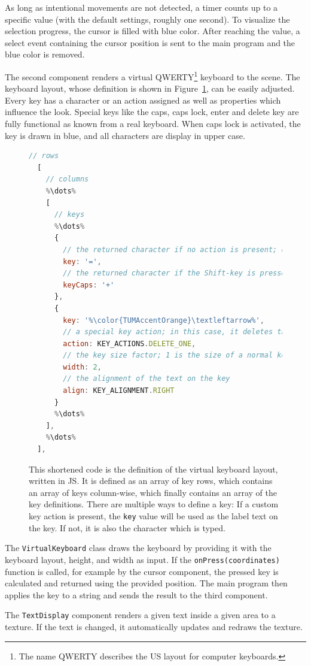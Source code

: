 As long as intentional movements are not detected, a timer counts up to a specific value (with the default settings, roughly one second). To visualize the selection progress, the cursor is filled with blue color. After reaching the value, a select event containing the cursor position is sent to the main program and the blue color is removed. 

The second component renders a virtual QWERTY\footnote{The name QWERTY describes the US layout for computer keyboards.} keyboard to the scene. The keyboard layout, whose definition is shown in Figure~\ref{fig:virtual-keyboard-layout}, can be easily adjusted. Every key has a character or an action assigned as well as properties which influence the look. Special keys like the caps, caps lock, enter and delete key are fully functional as known from a real keyboard. When caps lock is activated, the key is drawn in blue, and all characters are display in upper case.

\begin{figure}[H]
	\begin{lstlisting}[language=JavaScript]
  // rows
  [
    // columns
    %\dots%
    [ 
      // keys
      %\dots%
      {
        // the returned character if no action is present; otherwise just a label
        key: '=',
        // the returned character if the Shift-key is pressed
        keyCaps: '+'
      },
      {
        key: '%\color{TUMAccentOrange}\textleftarrow%',
        // a special key action; in this case, it deletes the last character
        action: KEY_ACTIONS.DELETE_ONE,
        // the key size factor; 1 is the size of a normal key
        width: 2, 
        // the alignment of the text on the key
        align: KEY_ALIGNMENT.RIGHT
      }
      %\dots%
    ],
    %\dots%
  ],
  \end{lstlisting}
	\caption[Virtual keyboard layout definition]{This shortened code is the definition of the virtual keyboard layout, written in \gls{JS}. It is defined as an array of key rows, which contains an array of keys column-wise, which finally contains an array of the key definitions. There are multiple ways to define a key: If a custom key action is present, the \lstinline{key} value will be used as the label text on the key. If not, it is also the character which is typed. }\label{fig:virtual-keyboard-layout}
\end{figure}

The \lstinline{VirtualKeyboard} class draws the keyboard by providing it with the keyboard layout, height, and width as input. If the \lstinline{onPress(coordinates)} function is called, for example by the cursor component, the pressed key is calculated and returned using the provided position. The main program then applies the key to a string and sends the result to the third component. %

The \lstinline{TextDisplay} component renders a given text inside a given area to a texture. If the text is changed, it automatically updates and redraws the texture.